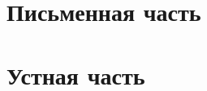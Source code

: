 \documentclass[12pt]{article}
\begin{document}
  
  \section{Письменная часть}
  
   \newpage
   \newpage
   \newpage
   \newpage
   \newpage
   \newpage
   \newpage
   \newpage
   \newpage
   \newpage

  \newpage

  \section{Устная часть}
   \newpage
   \newpage
   \newpage
   \newpage
   \newpage
  
\end{document}
